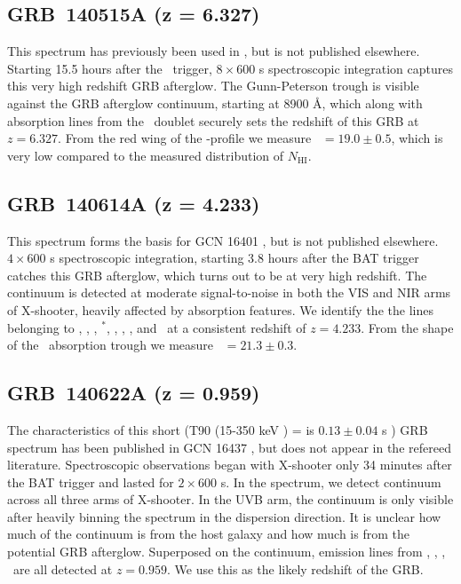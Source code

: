 \documentclass{aa}    %
\begin{document}
\subsection{GRB~140515A (z = 6.327)}\label{140515}

This spectrum has previously been used in \citet{Melandri2015}, but is not
published elsewhere. Starting 15.5 hours after the \swift~trigger, $8\times600$
s spectroscopic integration captures this very high redshift GRB afterglow. The
Gunn-Peterson trough is visible against the GRB afterglow continuum, starting at
8900 \AA, which along with absorption lines from the \mgii~doublet securely sets
the redshift of this GRB at $z = 6.327$. From the red wing of the \lya-profile
we measure \nh~$=19.0 \pm 0.5$, which is very low compared to the measured
distribution of $N_{\mathrm{HI}}$.

\subsection{GRB~140614A (z = 4.233)}\label{140614}

This spectrum forms the basis for GCN 16401 \citep{GCN16401}, but is not
published elsewhere. $4\times600$ s spectroscopic integration, starting 3.8
hours after the BAT trigger catches this GRB afterglow, which turns out to be at
very high redshift. The continuum is detected at moderate signal-to-noise in
both the VIS and NIR arms of X-shooter, heavily affected by absorption features.
We identify the the lines belonging to \lya, \SIii, \cii, \cii$^*$, \alii,
\aliii, \feii, and \mgii~at a consistent redshift of $z = 4.233$. From the shape
of the \lya~absorption trough we measure \nh~$=21.3 \pm 0.3$.

\subsection{GRB~140622A (z = 0.959)}\label{140622}

The characteristics of this short (T90 (15-350 keV ) = is $0.13 \pm 0.04$ s
\citep{Lien2016}) GRB spectrum has been published in GCN 16437 \citep{GCN16437},
but does not appear in the refereed literature. Spectroscopic observations began
with X-shooter only 34 minutes after the BAT trigger and lasted for $2\times600$
s. In the spectrum, we detect continuum across all three arms of X-shooter. In
the UVB arm, the continuum is only visible after heavily binning the spectrum in
the dispersion direction. It is unclear how much of the continuum is from the
host galaxy and how much is from the potential GRB afterglow. Superposed on the
continuum, emission lines from \oii, \hb, \oiii, \ha~are all detected at $z =
0.959$. We use this as the likely redshift of the GRB.
\end{document}
